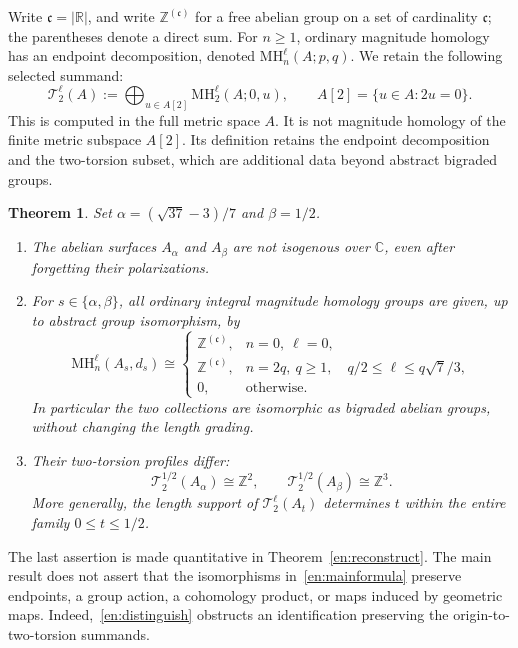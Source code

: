 \documentclass[12pt]{amsart}
\newcommand{\TheoremName}{Theorem}
\newtheorem{thm}{\TheoremName}[section]
\theoremstyle{definition}
\theoremstyle{remark}
\numberwithin{equation}{section}
\newcommand{\R}{\mathbb{R}}
\newcommand{\Z}{\mathbb{Z}}
\newcommand{\C}{\mathbb{C}}
\newcommand{\MH}{\mathrm{MH}}
\begin{document}
Write $\mathfrak c=|\R|$, and write $\Z^{(\mathfrak c)}$ for a free abelian group on a set of cardinality $\mathfrak c$; the parentheses denote a direct sum. For $n\geq1$, ordinary magnitude homology has an endpoint decomposition, denoted $\MH_n^\ell(A;p,q)$. We retain the following selected summand:
\begin{equation}\label{en:torsiondefinition}
\mathcal T_2^\ell(A):=
\bigoplus_{u\in A[2]}\MH_2^\ell(A;0,u),
\qquad A[2]=\{u\in A:2u=0\}.
\end{equation}
This is computed in the full metric space $A$. It is not magnitude homology of the finite metric subspace $A[2]$. Its definition retains the endpoint decomposition and the two-torsion subset, which are additional data beyond abstract bigraded groups.

\begin{thm}\label{en:main}
Set $\alpha=(\sqrt{37}-3)/7$ and $\beta=1/2$.
\begin{enumerate}
\item The abelian surfaces $A_\alpha$ and $A_\beta$ are not isogenous over $\C$, even after forgetting their polarizations.
\item For $s\in\{\alpha,\beta\}$, all ordinary integral magnitude homology groups are given, up to abstract group isomorphism, by
\begin{equation}\label{en:mainformula}
\MH_n^\ell(A_s,d_s)\cong
\begin{cases}
\Z^{(\mathfrak c)},&n=0,\ \ell=0,\\
\Z^{(\mathfrak c)},&n=2q,\ q\geq1,\quad
q/2\leq\ell\leq q\sqrt7/3,\\
0,&\text{otherwise}.
\end{cases}
\end{equation}
In particular the two collections are isomorphic as bigraded abelian groups, without changing the length grading.
\item Their two-torsion profiles differ:
\begin{equation}\label{en:distinguish}
\mathcal T_2^{1/2}(A_\alpha)\cong\Z^2,
\qquad \mathcal T_2^{1/2}(A_\beta)\cong\Z^3.
\end{equation}
More generally, the length support of $\mathcal T_2^\ell(A_t)$ determines $t$ within the entire family $0\leq t\leq1/2$.
\end{enumerate}
\end{thm}

The last assertion is made quantitative in Theorem~\ref{en:reconstruct}. The main result does not assert that the isomorphisms in~\eqref{en:mainformula} preserve endpoints, a group action, a cohomology product, or maps induced by geometric maps. Indeed,~\eqref{en:distinguish} obstructs an identification preserving the origin-to-two-torsion summands.
\end{document}
